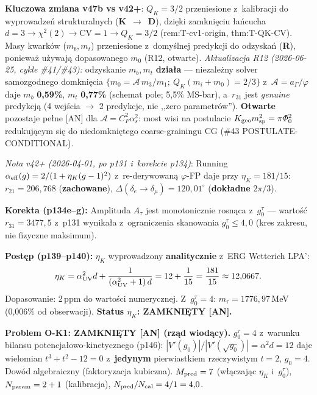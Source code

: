 \begin{remark}
\medskip\noindent
\textbf{Kluczowa zmiana v47b vs v42+}:
$Q_K = 3/2$ przeniesione z~kalibracji do wyprowadze\'n
strukturalnych (\textbf{K}~$\to$~\textbf{D}),
dzi\k{e}ki zamkni\k{e}ciu \l{}a\'ncucha
$d{=}3 \to \chi^2(2) \to \mathrm{CV}{=}1 \to Q_K{=}3/2$
(rem:T-cv1-origin, thm:T-QK-CV).
Masy kwark\'ow ($m_b, m_t$) przeniesione z~domy\'slnej
predykcji do odzyska\'n (\textbf{R}), poniewa\.z u\.zywaj\k{a}
dopasowanego $m_0$ (R12, otwarte).
%
\textsl{Aktualizacja R12 (2026-06-25, cykle \#41/\#43):} odzyskanie
$m_b, m_t$ \textbf{dzia\l{}a} --- niezale\.zny solver samozgodnego
domkni\k{e}cia $\{m_0 = \mathcal{A}\,m_3/m_1;\ Q_K(m_i{+}m_0) = 2/3\}$
z~$\mathcal{A} = a_\Gamma/\varphi$ daje $m_b$ \textbf{0,59\%},
$m_t$ \textbf{0,77\%} (schemat pole; 5,5\% MS-bar), a~$r_{31}$ jest
\emph{genuine} predykcj\k{a} (4 wej\'scia $\to$ 2 predykcje, nie ,,zero
parametr\'ow''). \textbf{Otwarte} pozostaje pe\l{}ne [AN] dla
$\mathcal{A} = C_F^2\alpha_s^2$: most wisi na postulacie
$K_{\rm geo} m_{\rm sp}^2 = \pi\varPhi_0^2$ redukuj\k{a}cym si\k{e}
do niedomkni\k{e}tego coarse-grainingu CG (\#43 POSTULATE-CONDITIONAL).

\smallskip\noindent
\emph{Nota v42+ (2026-04-01, po p131 i~korekcie p134)}:
Running $\alpha_{\rm eff}(g) = 2/(1+\eta_K(g-1)^2)$ z~re-derywowan\k{a}
$\varphi$-FP daje przy $\eta_K = 181/15$:
$r_{21} = 206{,}768$ (\textbf{zachowane}),
$\Delta(\delta_e \to \delta_\mu) = 120{,}01^\circ$ (\textbf{dok\l{}adne} $2\pi/3$).

\textbf{Korekta (p134e--g):} Amplituda $A_\tau$ jest monotonicznie
rosn\k{a}ca z~$g_0^\tau$ --- warto\'s\'c $r_{31} = 3477{,}5$ z~p131
wynika\l{}a z~ograniczenia skanowania $g_0^\tau \le 4{,}0$
(kres zakresu, nie fizyczne maksimum).

\textbf{Post\k{e}p (p139--p140):} $\eta_K$ wyprowadzony \textbf{analitycznie}
z~ERG Wetterich LPA':
\begin{equation}
  \eta_K = \alpha_{\rm UV}^2 d + \frac{1}{(\alpha_{\rm UV}^2+1)\,d}
  = 12 + \frac{1}{15} = \frac{181}{15} \approx 12{,}0667.
\end{equation}
Dopasowanie: 2\,ppm do warto\'sci numerycznej. Z~$g_0^\tau=4$:
$m_\tau = 1776{,}97$\,MeV (0{,}006\% od obserwacji).
\textbf{Status $\eta_K$: ZAMKNI\k{E}TY [AN].}

\textbf{Problem O-K1: ZAMKNI\k{E}TY [AN] (rz\k{a}d wiod\k{a}cy).}
$g_0^\tau = 4$ z~warunku bilansu potencja\l{}owo-kinetycznego (p146):
$|V'(g_0)|/|V'(\sqrt{g_0})| = \alpha^2 d = 12$ daje wielomian
$t^3+t^2-12=0$ z~\textbf{jedynym} pierwiastkiem rzeczywistym $t=2$,
$g_0=4$. Dow\'od algebraiczny (faktoryzacja kubiczna).
$M_{\rm pred} = 7$ (w\l{}\k{a}czaj\k{a}c $\eta_K$ i~$g_0^\tau$),
$N_{\rm param} = 2 + 1$ (kalibracja),
$N_{\rm pred}/N_{\rm cal} = 4/1 = 4{,}0$.


\end{remark}
